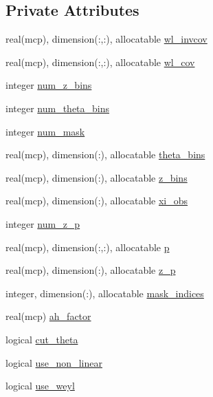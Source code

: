 \subsection*{Private Attributes}
\begin{DoxyCompactItemize}
\item 
real(mcp), dimension(\+:,\+:), allocatable \mbox{\hyperlink{structwl_1_1wllikelihood_a90c91fa62549d08474e536b6c3d105b3}{wl\+\_\+invcov}}
\item 
real(mcp), dimension(\+:,\+:), allocatable \mbox{\hyperlink{structwl_1_1wllikelihood_af27fede71b68ea45ccd44eff4571dc1b}{wl\+\_\+cov}}
\item 
integer \mbox{\hyperlink{structwl_1_1wllikelihood_ac85405c1637c007a476626c475e01b91}{num\+\_\+z\+\_\+bins}}
\item 
integer \mbox{\hyperlink{structwl_1_1wllikelihood_abbc71af7b630e7a9bffdc8c2afcdb8b6}{num\+\_\+theta\+\_\+bins}}
\item 
integer \mbox{\hyperlink{structwl_1_1wllikelihood_a7312a8efc03e9580b451151c03119571}{num\+\_\+mask}}
\item 
real(mcp), dimension(\+:), allocatable \mbox{\hyperlink{structwl_1_1wllikelihood_aef7e170301ecfa24f9c7a29cd1823ca5}{theta\+\_\+bins}}
\item 
real(mcp), dimension(\+:), allocatable \mbox{\hyperlink{structwl_1_1wllikelihood_a4d8bb3c571d3e503c238785fda7c1287}{z\+\_\+bins}}
\item 
real(mcp), dimension(\+:), allocatable \mbox{\hyperlink{structwl_1_1wllikelihood_af668ca5bc35acc0964269bda5fc8d20f}{xi\+\_\+obs}}
\item 
integer \mbox{\hyperlink{structwl_1_1wllikelihood_a9c1b24eeb1b81776bf43297bf0a39431}{num\+\_\+z\+\_\+p}}
\item 
real(mcp), dimension(\+:,\+:), allocatable \mbox{\hyperlink{structwl_1_1wllikelihood_aeeb6c56e9c81d50326040ccbad1f5cab}{p}}
\item 
real(mcp), dimension(\+:), allocatable \mbox{\hyperlink{structwl_1_1wllikelihood_ad2fdfc1eec8b08f6b5b70315922f7c43}{z\+\_\+p}}
\item 
integer, dimension(\+:), allocatable \mbox{\hyperlink{structwl_1_1wllikelihood_aa789f2c1917699231f07a4105e5e4ceb}{mask\+\_\+indices}}
\item 
real(mcp) \mbox{\hyperlink{structwl_1_1wllikelihood_a6d25c5bd105d44bf3c211d85af017163}{ah\+\_\+factor}}
\item 
logical \mbox{\hyperlink{structwl_1_1wllikelihood_af67f93141f7d6cf500adf424dec4dde6}{cut\+\_\+theta}}
\item 
logical \mbox{\hyperlink{structwl_1_1wllikelihood_aa1a9c592e094a1d46c93de88c5354fc8}{use\+\_\+non\+\_\+linear}}
\item 
logical \mbox{\hyperlink{structwl_1_1wllikelihood_a572af041b68968ed8b60952c77ae0b8c}{use\+\_\+weyl}}
\end{DoxyCompactItemize}


